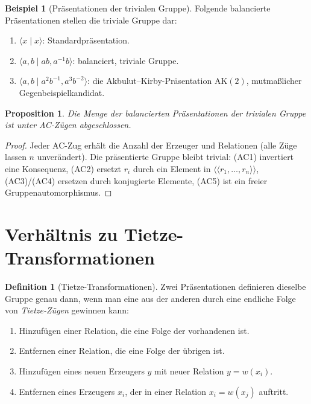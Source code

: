 \documentclass[12pt,a4paper]{amsart}
\newtheorem{proposition}[theorem]{Proposition}
\theoremstyle{definition}
\newtheorem{definition_de}[theorem]{Definition}
\newtheorem{beispiel}[theorem]{Beispiel}
\theoremstyle{remark}
\begin{document}
\begin{beispiel}[Präsentationen der trivialen Gruppe]\label{bsp:trivial}
Folgende balancierte Präsentationen stellen die triviale Gruppe dar:
\begin{enumerate}[label=(\alph*)]
  \item $\langle x \mid x \rangle$: Standardpräsentation.
  \item $\langle a, b \mid ab, a^{-1}b \rangle$: balanciert, triviale Gruppe.
  \item $\langle a, b \mid a^2 b^{-1}, a^3 b^{-2} \rangle$: die Akbulut--Kirby-Präsentation
        $\mathrm{AK}(2)$, mutmaßlicher Gegenbeispielkandidat.
\end{enumerate}
\end{beispiel}

\begin{proposition}
Die Menge der balancierten Präsentationen der trivialen Gruppe ist unter AC-Zügen abgeschlossen.
\end{proposition}

\begin{proof}
Jeder AC-Zug erhält die Anzahl der Erzeuger und Relationen (alle Züge lassen $n$
unverändert). Die präsentierte Gruppe bleibt trivial: (AC1) invertiert eine
Konsequenz, (AC2) ersetzt $r_i$ durch ein Element in $\langle\!\langle r_1,\ldots,r_n \rangle\!\rangle$,
(AC3)/(AC4) ersetzen durch konjugierte Elemente, (AC5) ist ein freier Gruppenautomorphismus.
\end{proof}

\section{Verhältnis zu Tietze-Transformationen}

\begin{definition_de}[Tietze-Transformationen]
Zwei Präsentationen definieren dieselbe Gruppe genau dann, wenn man eine aus der
anderen durch eine endliche Folge von \emph{Tietze-Zügen} gewinnen kann:
\begin{enumerate}[label=(T\arabic*)]
  \item Hinzufügen einer Relation, die eine Folge der vorhandenen ist.
  \item Entfernen einer Relation, die eine Folge der übrigen ist.
  \item Hinzufügen eines neuen Erzeugers $y$ mit neuer Relation $y = w(x_i)$.
  \item Entfernen eines Erzeugers $x_i$, der in einer Relation $x_i = w(x_j)$ auftritt.
\end{enumerate}
\end{definition_de}
\end{document}

